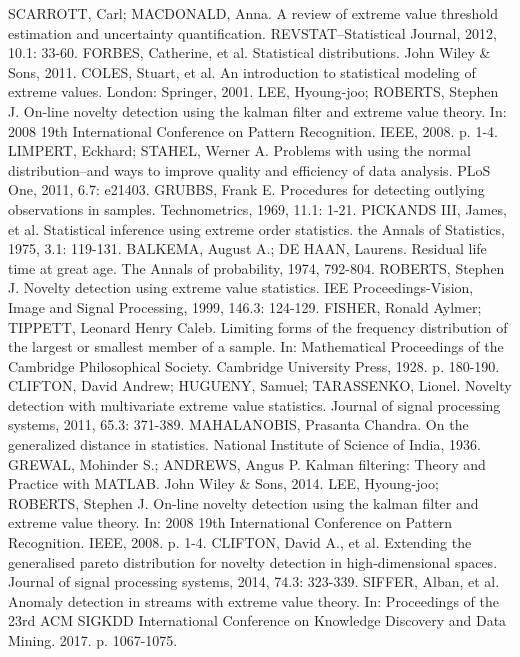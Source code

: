 \documentclass[11pt,twoside,openright]{report}
\begin{document}
\begin{thebibliography}{L}
SCARROTT, Carl; MACDONALD, Anna. A review of extreme value threshold estimation and uncertainty quantification. REVSTAT–Statistical Journal, 2012, 10.1: 33-60.
FORBES, Catherine, et al. Statistical distributions. John Wiley \& Sons, 2011.
COLES, Stuart, et al. An introduction to statistical modeling of extreme values. London: Springer, 2001.
LEE, Hyoung-joo; ROBERTS, Stephen J. On-line novelty detection using the kalman filter and extreme value theory. In: 2008 19th International Conference on Pattern Recognition. IEEE, 2008. p. 1-4.
LIMPERT, Eckhard; STAHEL, Werner A. Problems with using the normal distribution–and ways to improve quality and efficiency of data analysis. PLoS One, 2011, 6.7: e21403.
GRUBBS, Frank E. Procedures for detecting outlying observations in samples. Technometrics, 1969, 11.1: 1-21.
PICKANDS III, James, et al. Statistical inference using extreme order statistics. the Annals of Statistics, 1975, 3.1: 119-131.
BALKEMA, August A.; DE HAAN, Laurens. Residual life time at great age. The Annals of probability, 1974, 792-804.
ROBERTS, Stephen J. Novelty detection using extreme value statistics. IEE Proceedings-Vision, Image and Signal Processing, 1999, 146.3: 124-129.
FISHER, Ronald Aylmer; TIPPETT, Leonard Henry Caleb. Limiting forms of the frequency distribution of the largest or smallest member of a sample. In: Mathematical Proceedings of the Cambridge Philosophical Society. Cambridge University Press, 1928. p. 180-190.
CLIFTON, David Andrew; HUGUENY, Samuel; TARASSENKO, Lionel. Novelty detection with multivariate extreme value statistics. Journal of signal processing systems, 2011, 65.3: 371-389.
MAHALANOBIS, Prasanta Chandra. On the generalized distance in statistics. National Institute of Science of India, 1936.
GREWAL, Mohinder S.; ANDREWS, Angus P. Kalman filtering: Theory and Practice with MATLAB. John Wiley \& Sons, 2014.
LEE, Hyoung-joo; ROBERTS, Stephen J. On-line novelty detection using the kalman filter and extreme value theory. In: 2008 19th International Conference on Pattern Recognition. IEEE, 2008. p. 1-4.
CLIFTON, David A., et al. Extending the generalised pareto distribution for novelty detection in high-dimensional spaces. Journal of signal processing systems, 2014, 74.3: 323-339.
SIFFER, Alban, et al. Anomaly detection in streams with extreme value theory. In: Proceedings of the 23rd ACM SIGKDD International Conference on Knowledge Discovery and Data Mining. 2017. p. 1067-1075.

\end{thebibliography}
\end{document}
